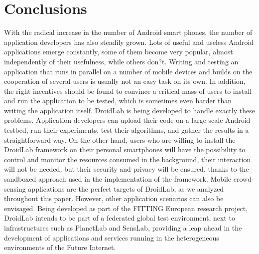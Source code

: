 \documentclass[conference,letterpaper]{IEEEtran}
\begin{document}
\section{Conclusions}
\label{sec:conclusion_and_future_work}
With the radical increase in the number of Android smart phones, the number of application developers has also steadily grown. Lots of useful and useless Android applications emerge constantly, some of them become very popular, almost independently of their usefulness, while others don?t. Writing and testing an application that runs in parallel on a number of mobile devices and builds on the cooperation of several users is usually not an easy task on its own. In addition, the right incentives should be found to convince a critical mass of users to install and run the application to be tested, which is sometimes even harder than writing the application itself. DroidLab is being developed to handle exactly these problems. Application developers can upload their code on a large-scale Android testbed, run their experiments, test their algorithms, and gather the results in a straightforward way. On the other hand, users who are willing to install the DroidLab framework on their personal smartphones will have the possibility to control and monitor the resources consumed in the background, their interaction will not be needed, but their security and privacy will be ensured, thanks to the sandboxed approach used in the implementation of the framework.  Mobile crowd-sensing applications are the perfect targets of DroidLab, as we analyzed throughout this paper. However, other application scenarios can also be envisaged. Being developed as part of the FITTING European research project, DroidLab intends to be part of a federated global test environment, next to infrastructures such as PlanetLab and SensLab, providing a leap ahead in the development of applications and services running in the heterogeneous environments of the Future Internet.       


\end{document}
